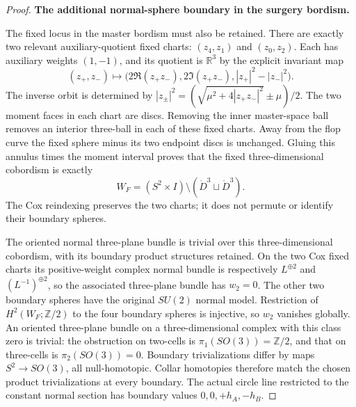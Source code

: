\begin{proof}
\par\medskip\noindent\textbf{The additional normal-sphere boundary in the surgery bordism.}\enspace

The fixed locus in the master bordism must also be retained.
There are exactly two relevant auxiliary-quotient fixed charts:
\((z_4,z_1)\) and \((z_0,z_2)\).  Each has auxiliary
weights \((1,-1)\), and its quotient is \(\mathbb R^3\)
by the explicit invariant map
\[
      (z_+,z_-)\longmapsto
       \bigl(2\Re(z_+z_-),2\Im(z_+z_-),
                         |z_+|^2-|z_-|^2\bigr).
\]
The inverse orbit is determined by
\(|z_\pm|^2=(\sqrt{\mu^2+4|z_+z_-|^2}\pm\mu)/2\).
The two moment faces in each chart are discs.  Removing the
inner master-space ball removes an interior three-ball in
each of these fixed charts.  Away from the flop curve the
fixed sphere minus its two endpoint discs is unchanged.
Gluing this annulus times the moment interval proves that
the fixed three-dimensional cobordism is exactly
\[
                 W_F=(S^2\times I)\setminus
                             (\mathring D^3\sqcup\mathring D^3).
\]
The Cox reindexing preserves the two charts; it does not
permute or identify their boundary spheres.

The oriented normal three-plane bundle is trivial over this
three-dimensional cobordism, with its boundary product
structures retained.  On the two Cox fixed charts its
positive-weight complex normal bundle is respectively
\(L^{\oplus2}\) and \((L^{-1})^{\oplus2}\), so the
associated three-plane bundle has \(w_2=0\).  The other
two boundary spheres have the original \(SU(2)\) normal
model.  Restriction of \(H^2(W_F;\mathbb Z/2)\) to
the four boundary spheres is injective, so \(w_2\) vanishes
globally.  An oriented three-plane bundle on a three-dimensional
complex with this class zero is trivial: the obstruction on
two-cells is \(\pi_1(SO(3))=\mathbb Z/2\), and that
on three-cells is \(\pi_2(SO(3))=0\).  Boundary
trivializations differ by maps \(S^2\to SO(3)\), all
null-homotopic.  Collar homotopies therefore match the chosen
product trivializations at every boundary.  The actual circle
line restricted to the constant normal section has boundary
values \(0,0,+h_A,-h_B\).


\end{proof}
